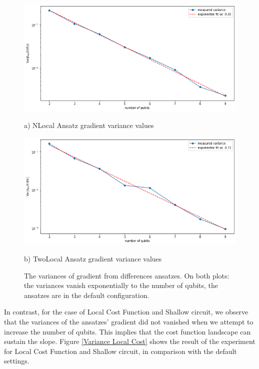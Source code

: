 \begin{figure}
    \includegraphics[width=\textwidth]{Artefact/Appendices/NLocalDefault.png}
    \centerline{a) NLocal Ansatz gradient variance values}
    \includegraphics[width=\textwidth]{Artefact/Appendices/TwoLocalDefault.png}
    \centerline{b) TwoLocal Ansatz gradient variance values}
    \caption{
        The variances of gradient from differences ansatzes.
        On both plots: the variances vanish exponentially to the number of qubits, the ansatzes are in the default configuration.
    }
    \label{Plot ansatzes gradients default}
\end{figure}

In contrast, for the case of Local Cost Function and Shallow circuit, we observe that the variances of the ansatzes' gradient did not vanished when we attempt to increase the number of qubits.
This implies that the cost function landscape can sustain the slope.
Figure \ref{Variance Local Cost} shows the result of the experiment for Local Cost Function and Shallow circuit, in comparison with the default settings.

